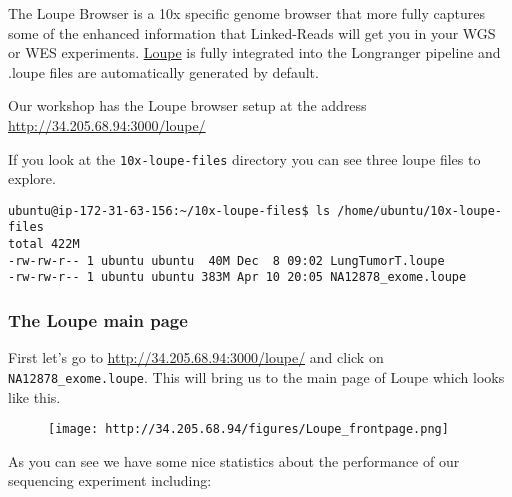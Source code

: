 \documentclass[]{article}
\begin{document}
The Loupe Browser is a 10x specific genome browser that more fully
captures some of the enhanced information that Linked-Reads will get you
in your WGS or WES experiments.
\href{https://support.10xgenomics.com/genome-exome/software/visualization/latest/what-is-loupe}{Loupe}
is fully integrated into the Longranger pipeline and .loupe files are
automatically generated by default.

Our workshop has the Loupe browser setup at the address
\url{http://34.205.68.94:3000/loupe/}

If you look at the \texttt{10x-loupe-files} directory you can see three
loupe files to explore.

\begin{verbatim}
ubuntu@ip-172-31-63-156:~/10x-loupe-files$ ls /home/ubuntu/10x-loupe-files
total 422M
-rw-rw-r-- 1 ubuntu ubuntu  40M Dec  8 09:02 LungTumorT.loupe
-rw-rw-r-- 1 ubuntu ubuntu 383M Apr 10 20:05 NA12878_exome.loupe
\end{verbatim}

\subsubsection{The Loupe main page}\label{the-loupe-main-page}

First let's go to \url{http://34.205.68.94:3000/loupe/} and click on
\texttt{NA12878\_exome.loupe}. This will bring us to the main page of
Loupe which looks like this.

\begin{figure}[htbp]
\centering
\texttt{[image: http://34.205.68.94/figures/Loupe\_frontpage.png]}
\caption{}
\end{figure}

As you can see we have some nice statistics about the performance of our
sequencing experiment including:
\end{document}
